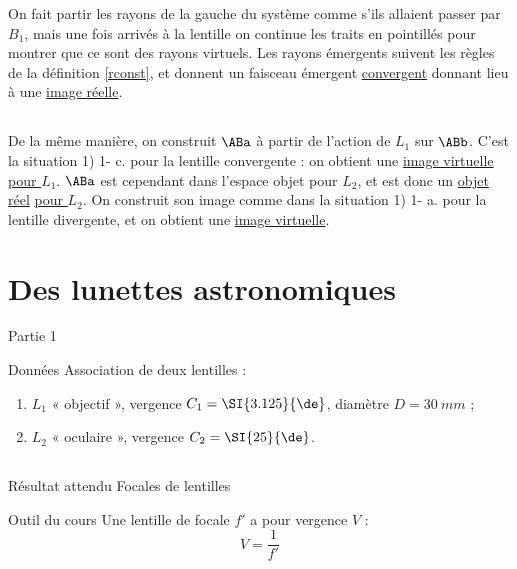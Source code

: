 \documentclass[10pt,notitlepage]{book}
\begin{document}
On fait partir les rayons de la gauche du système comme s'ils allaient passer
par $B_1$, mais une fois arrivés à la lentille on continue les traits en
pointillés pour montrer que ce sont des rayons virtuels. Les rayons émergents
suivent les règles de la définition \ref{rconst}, et donnent un faisceau
émergent \underline{convergent} donnant lieu à une \underline{image réelle}.

\subsection{}
De la même manière, on construit $\ABa$ à partir de l'action de $L_1$ sur
$\ABb$.  C'est la situation 1) 1- c. pour la lentille convergente : on obtient
une \underline{image virtuelle} \underline{\underline{pour $L_1$}}. $\ABa$ est
cependant dans l'espace objet pour $L_2$, et est donc un \underline{objet réel}
\underline{\underline{pour $L_2$}}. On construit son image comme dans la
situation 1) 1- a. pour la lentille divergente, et on obtient une
\underline{image virtuelle}.

\section{Des lunettes astronomiques}
\begin{center}
    \huge Partie 1
\end{center}

\pagebreak

\begin{NCdefi}{Données}
    Association de deux lentilles :
    \begin{enumerate}
        \item $L_1$ « objectif », vergence $C_1 = \SI{3.125}{\de}$, diamètre $D
            = \SI{30}{mm}$ ;
        \item $L_2$ « oculaire », vergence $C_2 = \SI{25}{\de}$.
    \end{enumerate}
\end{NCdefi}

\subsection{}

\begin{NCprop}{Résultat attendu}
    Focales de lentilles
\end{NCprop}

\begin{NCdemo}{Outil du cours}
    Une lentille de focale $f'$ a pour vergence $V$ :
    \[ V = \frac{1}{f'} \]
\end{NCdemo}
\end{document}
